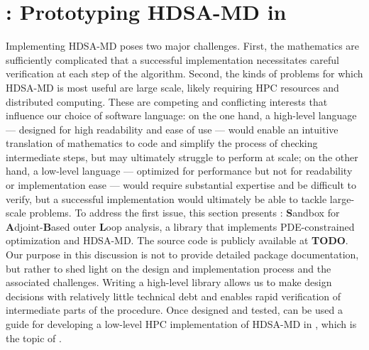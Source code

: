\section{\SABL: Prototyping HDSA-MD in \MATLAB}
\label{sec:sabl}


Implementing HDSA-MD poses two major challenges.
First, the mathematics are sufficiently complicated that a successful implementation necessitates careful verification at each step of the algorithm.
Second, the kinds of problems for which HDSA-MD is most useful are large scale, likely requiring HPC resources and distributed computing.
These are competing and conflicting interests that influence our choice of software language: on the one hand, a high-level language --- designed for high readability and ease of use --- would enable an intuitive translation of mathematics to code and simplify the process of checking intermediate steps, but may ultimately struggle to perform at scale; on the other hand, a low-level language --- optimized for performance but not for readability or implementation ease --- would require substantial expertise and be difficult to verify, but a successful implementation would ultimately be able to tackle large-scale problems.
To address the first issue, this section presents \SABL: \textbf{S}andbox for \textbf{A}djoint-\textbf{B}ased outer \textbf{L}oop analysis, a \MATLAB library that implements PDE-constrained optimization and HDSA-MD.
The source code is publicly available at \textbf{TODO}.
Our purpose in this discussion is not to provide detailed package documentation, but rather to shed light on the design and implementation process and the associated challenges.
Writing a high-level library allows us to make design decisions with relatively little technical debt and enables rapid verification of intermediate parts of the procedure.
Once designed and tested, \SABL can be used a guide for developing a low-level HPC implementation of HDSA-MD in \cpp, which is the topic of .

